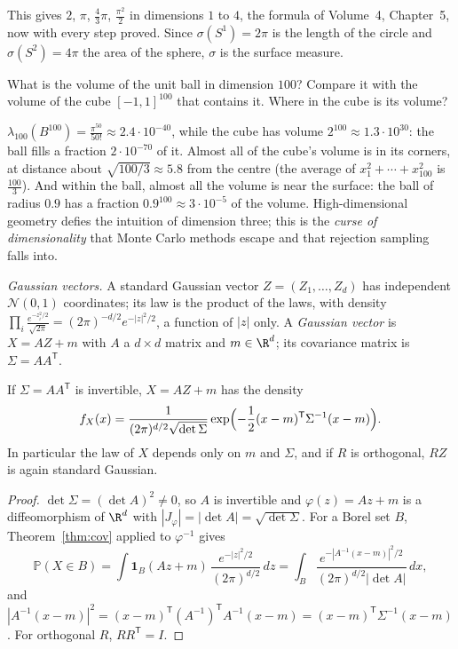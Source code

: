This gives $2$, $\pi$, $\frac43\pi$, $\frac{\pi^2}2$ in dimensions $1$ to $4$, the formula of Volume~4, Chapter~5, now with every step proved. Since $\sigma(S^1)=2\pi$ is the length of the circle and
$\sigma(S^2)=4\pi$ the area of the sphere, $\sigma$ is the surface measure.

\begin{think}
What is the volume of the unit ball in dimension $100$? Compare it with the volume of the cube $[-1,1]^{100}$ that contains it. Where in the cube is its volume?
\end{think}

$\lambda_{100}(B^{100})=\frac{\pi^{50}}{50!}\approx2.4\cdot10^{-40}$, while the cube has volume $2^{100}\approx1.3\cdot10^{30}$: the ball fills a fraction $2\cdot10^{-70}$ of it. Almost all of the cube's volume is in its
corners, at distance about $\sqrt{100/3}\approx5.8$ from the centre (the average of $x_1^2+\cdots+x_{100}^2$ is $\frac{100}3$). And within the ball, almost all the volume is near the surface: the ball of
radius $0.9$ has a fraction $0.9^{100}\approx3\cdot10^{-5}$ of the volume. High-dimensional geometry defies the intuition of dimension three; this is the \emph{curse of dimensionality}
that Monte Carlo methods escape and that rejection sampling falls into.

\emph{Gaussian vectors.} A standard Gaussian vector $Z=(Z_1,\dots,Z_d)$ has independent $\mathcal N(0,1)$ coordinates; its law is the product of the laws, with density
$\prod_i\frac{e^{-z_i^2/2}}{\sqrt{2\pi}}=(2\pi)^{-d/2}e^{-|z|^2/2}$, a function of $|z|$ only. A \emph{Gaussian vector} is $X=AZ+m$ with $A$ a $d\times d$ matrix and $m\in\R^d$; its covariance matrix is
$\Sigma=AA^{\mathsf T}$.

\begin{theorem}\label{thm:gaussdensity}
If $\Sigma=AA^{\mathsf T}$ is invertible, $X=AZ+m$ has the density
\[f_X(x)=\frac1{(2\pi)^{d/2}\sqrt{\det\Sigma}}\exp\Bigl(-\frac12(x-m)^{\mathsf T}\Sigma^{-1}(x-m)\Bigr).\]
In particular the law of $X$ depends only on $m$ and $\Sigma$, and if $R$ is orthogonal, $RZ$ is again standard Gaussian.
\end{theorem}
\begin{proof}
$\det\Sigma=(\det A)^2\ne0$, so $A$ is invertible and $\varphi(z)=Az+m$ is a diffeomorphism of $\R^d$ with $|J_\varphi|=|\det A|=\sqrt{\det\Sigma}$. For a Borel set $B$, Theorem~\ref{thm:cov} applied to $\varphi^{-1}$ gives
\[\mathbb P(X\in B)=\int\mathbf 1_B(Az+m)\,\frac{e^{-|z|^2/2}}{(2\pi)^{d/2}}\,dz=\int_B\frac{e^{-|A^{-1}(x-m)|^2/2}}{(2\pi)^{d/2}|\det A|}\,dx,\]
and $|A^{-1}(x-m)|^2=(x-m)^{\mathsf T}(A^{-1})^{\mathsf T}A^{-1}(x-m)=(x-m)^{\mathsf T}\Sigma^{-1}(x-m)$. For orthogonal $R$, $RR^{\mathsf T}=I$.
\end{proof}

